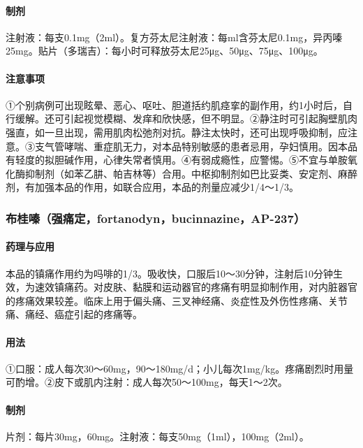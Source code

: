 \paragraph{制剂}

注射液：每支0.1mg（2ml）。复方芬太尼注射液：每ml含芬太尼0.1mg，异丙嗪25mg。贴片（多瑞吉）：每小时可释放芬太尼25μg、50μg、75μg、100μg。

\paragraph{注意事项}

①个别病例可出现眩晕、恶心、呕吐、胆道括约肌痉挛的副作用，约1小时后，自行缓解。还可引起视觉模糊、发痒和欣快感，但不明显。②静注时可引起胸壁肌肉强直，如一旦出现，需用肌肉松弛剂对抗。静注太快时，还可出现呼吸抑制，应注意。③支气管哮喘、重症肌无力，对本品特别敏感的患者忌用，孕妇慎用。因本品有轻度的拟胆碱作用，心律失常者慎用。④有弱成瘾性，应警惕。⑤不宜与单胺氧化酶抑制剂（如苯乙肼、帕吉林等）合用。中枢抑制剂如巴比妥类、安定剂、麻醉剂，有加强本品的作用，如联合应用，本品的剂量应减少1/4～1/3。

\subsubsection{布桂嗪（强痛定，fortanodyn，bucinnazine，AP-237）}

\paragraph{药理与应用}

本品的镇痛作用约为吗啡的1/3。吸收快，口服后10～30分钟，注射后10分钟生效，为速效镇痛药。对皮肤、黏膜和运动器官的疼痛有明显抑制作用，对内脏器官的疼痛效果较差。临床上用于偏头痛、三叉神经痛、炎症性及外伤性疼痛、关节痛、痛经、癌症引起的疼痛等。

\paragraph{用法}

①口服：成人每次30～60mg，90～180mg/d；小儿每次1mg/kg。疼痛剧烈时用量可酌增。②皮下或肌内注射：成人每次50～100mg，每天1～2次。

\paragraph{制剂}

片剂：每片30mg，60mg。注射液：每支50mg（1ml），100mg（2ml）。

